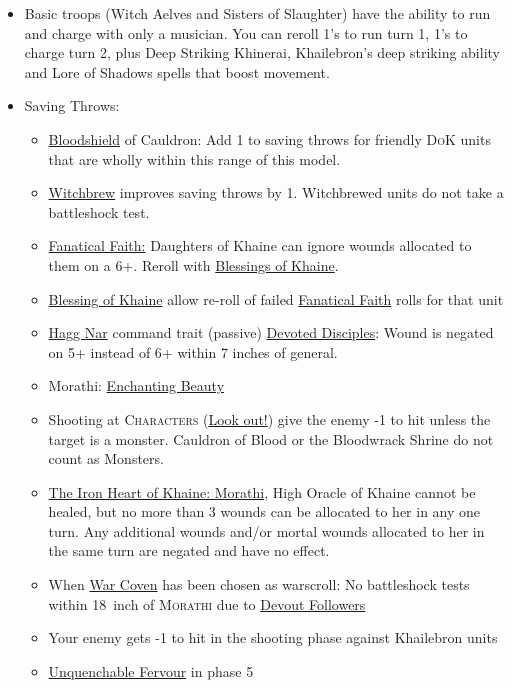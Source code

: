 \begin{itemize}
\item Basic troops (Witch Aelves and Sisters of Slaughter) have the ability to
    run and charge with only a musician.  You can reroll 1's to run turn 1, 1's
        to charge turn 2, plus Deep
        Striking Khinerai, Khailebron's deep striking ability and Lore of
        Shadows spells that boost movement.
\item Saving Throws:
    \begin{itemize}
        \item \hyperref[bloodshield]{Bloodshield} of Cauldron: Add 1 to saving
            throws for friendly \textsc{DoK} units that are wholly within this
            range of this model.
        \item \hyperref[witchbrew]{Witchbrew} improves saving throws by 1. Witchbrewed
            units do not take a battleshock test.
        \item \hyperref[fanatical-faith]{Fanatical Faith:} Daughters of Khaine
            can ignore wounds allocated to them on a 6+. Reroll with
            \hyperref[blessing-of-khaine]{Blessings of Khaine}.
        \item \hyperref[blessing-of-khaine]{Blessing of Khaine} allow re-roll
            of failed \hyperref[fanatical-faith]{Fanatical Faith} rolls for that unit
        \item \hyperref[hagg-nar]{Hagg Nar} command trait (passive)
            \hyperref[devoted-disciples]{Devoted Disciples}: Wound is negated
            on 5+ instead of 6+ within 7 inches of general. 
        \item Morathi: \hyperref[enchanting-beauty]{Enchanting Beauty}
        \item Shooting at \textsc{Characters} (\hyperref[corerule:look-out-sir]{Look
            out!}) give the enemy -1 to hit unless the target is a monster.
            Cauldron of Blood  or the Bloodwrack Shrine do not
            count as Monsters. 
        \item \hyperref[the-iron-heart-of-khaine]{The Iron Heart of Khaine:
            Morathi}, High Oracle of Khaine cannot be healed, but no more than
            3 wounds can be allocated to her in any one turn. Any additional
            wounds and/or mortal wounds allocated to her in the same turn are
            negated and have no effect.
        \item When \hyperref[war-coven]{War Coven} has been chosen as warscroll: No battleshock tests
            within 18~inch of \textsc{Morathi} due to \hyperref[devout-followers]{Devout
            Followers}
        \item Your enemy gets -1 to hit in the shooting phase against
            Khailebron units
        \item \hyperref[unquenchable-fervour]{Unquenchable Fervour} in phase 5
    \end{itemize}
\end{itemize}


